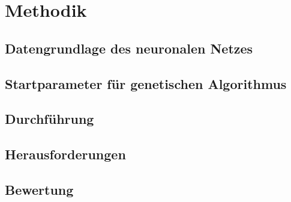 \chapter{Methodik}
\section{Datengrundlage des neuronalen Netzes}
\section{Startparameter für genetischen Algorithmus}
\section{Durchführung}
\section{Herausforderungen}
\section{Bewertung}